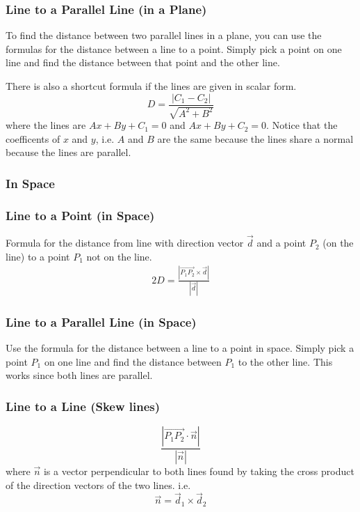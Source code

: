 \documentclass{report}
\theoremstyle{definition}
\numberwithin{equation}{section}
\begin{document}
\subsubsection*{Line to a Parallel Line (in a Plane)}
To find the distance between two parallel lines in a plane, you can use the formulas for the distance between a line to a point. Simply pick a point on one line and find the distance between that point and the other line.

\bigskip \noindent
There is also a shortcut formula if the lines are given in scalar form.
\begin{equation}
	D = \frac{|C_1 - C_2|}{\sqrt{A^2+B^2}}
\end{equation}
where the lines are $Ax+By+C_1=0$ and $Ax+By+C_2=0$. Notice that the coefficents of $x$ and $y$, i.e. $A$ and $B$ are the same because the lines share a normal because the lines are parallel.

\subsubsection{In Space}
\subsubsection*{Line to a Point (in Space)}
Formula for the distance from line with direction vector $\vec d$ and a point $P_2$ (on the line) to a point $P_1$ not on the line.
\begin{alignat*}{2}{}
	D = \frac{|\overrightarrow{P_1P_2} \times \vec d |}{|\vec d|}
\end{alignat*}

\subsubsection{Line to a Parallel Line (in Space)}
Use the formula for the distance between a line to a point in space. Simply pick a point $P_1$ on one line and find the distance between $P_1$ to the other line. This works since both lines are parallel.

\subsubsection{Line to a Line (Skew lines)}
\begin{equation}
	\frac{|\overrightarrow{P_1P_2} \cdot \vec n|}{|\vec n|}
\end{equation}
where $\vec n$ is a vector perpendicular to both lines found by taking the cross product of the direction vectors of the two lines. i.e.
\begin{equation*}
	\vec n = \vec d_1 \times \vec d_2
\end{equation*}
\end{document}
